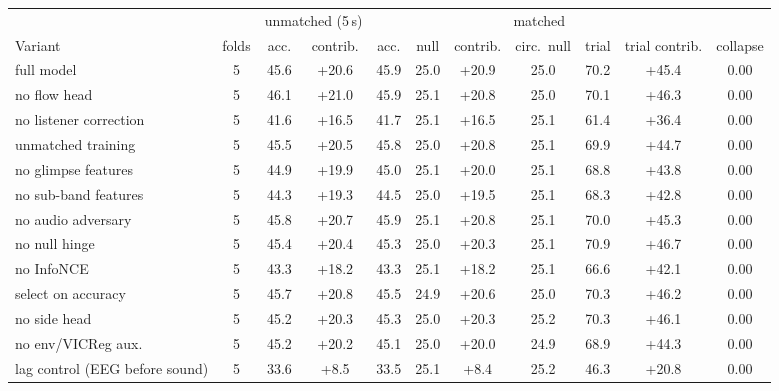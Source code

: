 \begin{tabular}{lc|cc|cccccc|c}\toprule
 & & \multicolumn{2}{c|}{unmatched (5\,s)} & \multicolumn{6}{c|}{matched} & \\
Variant & folds & acc. & contrib. & acc. & null & contrib. & circ.\ null & trial & trial contrib. & collapse \\\midrule
full model & 5 & 45.6 & +20.6 & 45.9 & 25.0 & +20.9 & 25.0 & 70.2 & +45.4 & 0.00 \\
no flow head & 5 & 46.1 & +21.0 & 45.9 & 25.1 & +20.8 & 25.0 & 70.1 & +46.3 & 0.00 \\
no listener correction & 5 & 41.6 & +16.5 & 41.7 & 25.1 & +16.5 & 25.1 & 61.4 & +36.4 & 0.00 \\
unmatched training & 5 & 45.5 & +20.5 & 45.8 & 25.0 & +20.8 & 25.1 & 69.9 & +44.7 & 0.00 \\
no glimpse features & 5 & 44.9 & +19.9 & 45.0 & 25.1 & +20.0 & 25.1 & 68.8 & +43.8 & 0.00 \\
no sub-band features & 5 & 44.3 & +19.3 & 44.5 & 25.0 & +19.5 & 25.1 & 68.3 & +42.8 & 0.00 \\
no audio adversary & 5 & 45.8 & +20.7 & 45.9 & 25.1 & +20.8 & 25.1 & 70.0 & +45.3 & 0.00 \\
no null hinge & 5 & 45.4 & +20.4 & 45.3 & 25.0 & +20.3 & 25.1 & 70.9 & +46.7 & 0.00 \\
no InfoNCE & 5 & 43.3 & +18.2 & 43.3 & 25.1 & +18.2 & 25.1 & 66.6 & +42.1 & 0.00 \\
select on accuracy & 5 & 45.7 & +20.8 & 45.5 & 24.9 & +20.6 & 25.0 & 70.3 & +46.2 & 0.00 \\
no side head & 5 & 45.2 & +20.3 & 45.3 & 25.0 & +20.3 & 25.2 & 70.3 & +46.1 & 0.00 \\
no env/VICReg aux. & 5 & 45.2 & +20.2 & 45.1 & 25.0 & +20.0 & 24.9 & 68.9 & +44.3 & 0.00 \\
lag control (EEG before sound) & 5 & 33.6 & +8.5 & 33.5 & 25.1 & +8.4 & 25.2 & 46.3 & +20.8 & 0.00 \\
\bottomrule\end{tabular}
